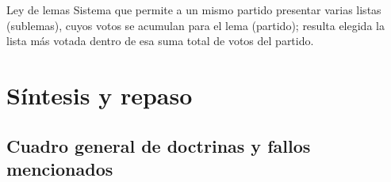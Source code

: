 \documentclass[12pt,oneside]{book}
\begin{document}
\begin{definition}{Ley de lemas}
Sistema que permite a un mismo partido presentar varias listas (sublemas), cuyos votos se acumulan para el lema (partido); resulta elegida la lista más votada dentro de esa suma total de votos del partido.
\end{definition}

\chapter{Síntesis y repaso}

\section{Cuadro general de doctrinas y fallos mencionados}
\end{document}
